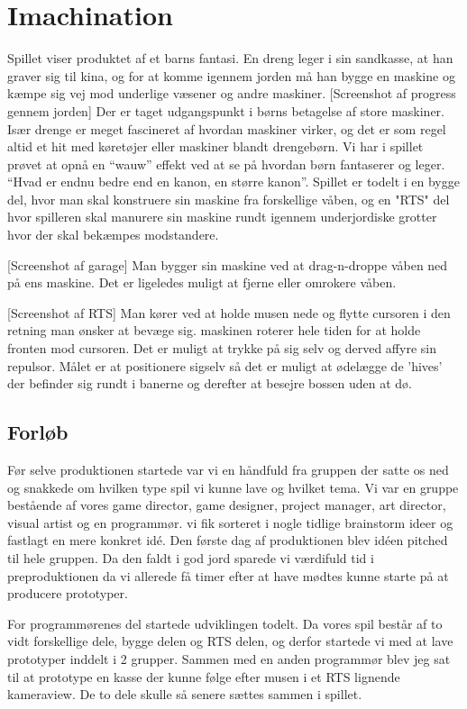 \section{Imachination}
Spillet viser produktet af et barns fantasi. En dreng leger i sin sandkasse, at han graver sig til kina, og for at komme igennem jorden må han bygge en maskine og kæmpe sig vej mod underlige væsener og andre maskiner.
[Screenshot af progress gennem jorden]
Der er taget udgangspunkt i børns betagelse af store maskiner. Især drenge er meget fascineret af hvordan maskiner virker, og det er som regel altid et hit med køretøjer eller maskiner blandt drengebørn. Vi har i spillet prøvet at opnå en ``wauw'' effekt ved at se på hvordan børn fantaserer og leger. ``Hvad er endnu bedre end en kanon, en større kanon''.
Spillet er todelt i en bygge del, hvor man skal konstruere sin maskine fra forskellige våben, og en "RTS" del hvor spilleren skal manurere sin maskine rundt igennem underjordiske grotter hvor der skal bekæmpes modstandere.

[Screenshot af garage]
Man bygger sin maskine ved at drag-n-droppe våben ned på ens maskine. Det er ligeledes muligt at fjerne eller omrokere våben.

[Screenshot af RTS]
Man kører ved at holde musen nede og flytte cursoren i den retning man ønsker at bevæge sig. maskinen roterer hele tiden for at holde fronten mod cursoren. Det er muligt at trykke på sig selv og derved affyre sin repulsor. Målet er at positionere sigselv så det er muligt at ødelægge de 'hives' der befinder sig rundt i banerne og derefter at besejre bossen uden at dø.


\subsection{Forløb}

Før selve produktionen startede var vi en håndfuld fra gruppen der satte os ned og snakkede om hvilken type spil vi kunne lave og hvilket tema. Vi var en gruppe bestående af vores game director, game designer, project manager, art director, visual artist og en programmør. vi fik sorteret i nogle tidlige brainstorm ideer og fastlagt en mere konkret idé. Den første dag af produktionen blev idéen pitched til hele gruppen. Da den faldt i god jord sparede vi værdifuld tid i preproduktionen da vi allerede få timer efter at have mødtes kunne starte på at producere prototyper.

For programmørenes del startede udviklingen todelt. Da vores spil består af to vidt forskellige dele, bygge delen og RTS delen, og derfor startede vi med at lave prototyper inddelt i 2 grupper. Sammen med en anden programmør blev jeg sat til at prototype en kasse der kunne følge efter musen i et RTS lignende kameraview. De to dele skulle så senere sættes sammen i spillet.


